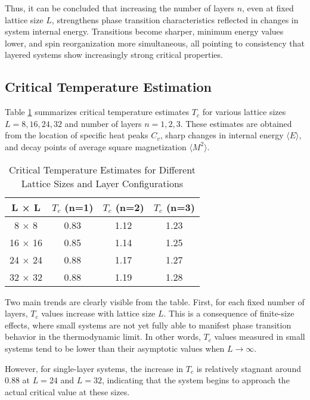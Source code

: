 Thus, it can be concluded that increasing the number of layers $n$, even at fixed lattice size $L$, strengthens phase transition characteristics reflected in changes in system internal energy. Transitions become sharper, minimum energy values lower, and spin reorganization more simultaneous, all pointing to consistency that layered systems show increasingly strong critical properties.

\subsection{Critical Temperature Estimation}

Table \ref{tab:critical_temp} summarizes critical temperature estimates $T_c$ for various lattice sizes $L = 8, 16, 24, 32$ and number of layers $n = 1, 2, 3$. These estimates are obtained from the location of specific heat peaks $C_v$, sharp changes in internal energy $\langle E \rangle$, and decay points of average square magnetization $\langle M^2 \rangle$.

\begin{table}[ht]
\centering
	\begin{center}
		\caption{Critical Temperature Estimates for Different Lattice Sizes and Layer Configurations}
		\label{tab:critical_temp}
		\small
		\begin{tabular}{ c  c  c  c }
			\hline
			L × L & $T_c$ (n=1) & $T_c$ (n=2) & $T_c$ (n=3)\\
			\hline
			8 × 8 & 0.83 & 1.12 & 1.23 \\
			16 × 16 & 0.85 & 1.14 & 1.25 \\
			24 × 24 & 0.88 & 1.17 & 1.27 \\
			32 × 32 & 0.88 & 1.19 & 1.28 \\
			\hline
		\end{tabular}
	\end{center}
\end{table}

Two main trends are clearly visible from the table. First, for each fixed number of layers, $T_c$ values increase with lattice size $L$. This is a consequence of finite-size effects, where small systems are not yet fully able to manifest phase transition behavior in the thermodynamic limit. In other words, $T_c$ values measured in small systems tend to be lower than their asymptotic values when $L \rightarrow \infty$.

However, for single-layer systems, the increase in $T_c$ is relatively stagnant around 0.88 at $L = 24$ and $L = 32$, indicating that the system begins to approach the actual critical value at these sizes.

